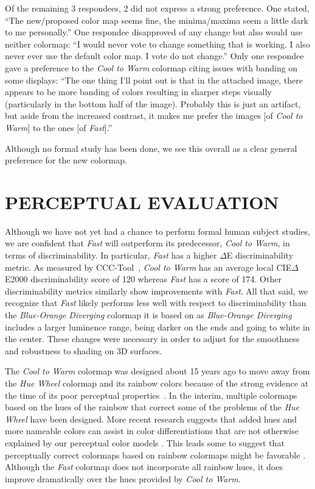 \documentclass{IEEEcsmag}
\newcommand*{\colormap}[1]{\textsl{#1}\xspace}
\newcommand*{\huewheel}{\colormap{Hue Wheel}}
\newcommand*{\coolwarm}{\colormap{Cool to Warm}}
\newcommand*{\blueorange}{\colormap{Blue-Orange Diverging}}
\newcommand*{\fast}{\colormap{Fast}}
\begin{document}
Of the remaining 3 respondees, 2 did not express a strong preference.
One stated, ``The new/proposed color map seems fine, the minima/maxima seem a little dark to me personally.''
One respondee disapproved of any change but also would use neither colormap: ``I would never vote to change something that is working.  I also never ever use the default color map. I vote do not change.''
Only one respondee gave a preference to the \coolwarm colormap citing issues with banding on some displays: ``The one thing I’ll point out is that in the attached image, there appears to be more banding of colors resulting in sharper steps visually (particularly in the bottom half of the image). Probably this is just an artifact, but aside from the increased contrast, it makes me prefer the images [of \coolwarm{}] to the ones [of \fast{}].''

Although no formal study has been done, we see this overall as a clear general preference for the new colormap.


\section{PERCEPTUAL EVALUATION}

Although we have not yet had a chance to perform formal human subject studies, we are confident that \fast will outperform its predecessor, \coolwarm, in terms of discriminability.
In particular, \fast has a higher $\Delta$E discriminability metric.
As measured by CCC-Tool~\cite{Nardini2021}, \coolwarm has an average local CIE$\Delta$E2000 discriminability score of 120 whereas \fast has a score of 174. Other discriminability metrics similarly show improvements with \fast.
All that said, we recognize that \fast%
likely performs less well with respect to discriminability than the \blueorange colormap it is based on as \blueorange includes a larger luminence range, being darker on the ends and going to white in the center.
These changes were necessary in order to adjust for the smoothness and robustness to shading on 3D surfaces.

The \coolwarm colormap was designed about 15 years ago to move away from the \huewheel colormap and its rainbow colors because of the strong evidence at the time of its poor perceptual properties~\cite{Rogowitz1998,Borland2007,Ware1988,Light2004}.
In the interim, multiple colormaps based on the hues of the rainbow that correct some of the problems of the \huewheel have been designed.
More recent research suggests that added hues and more nameable colors can assist in color differentiations that are not otherwise explained by our perceptual color models \cite{Reda2021}.
This leads some to suggest that perceptually correct colormaps based on rainbow colormaps might be favorable \cite{Ware2023}.
Although the \fast colormap does not incorporate all rainbow hues, it does improve dramatically over the hues provided by \coolwarm.
\end{document}
